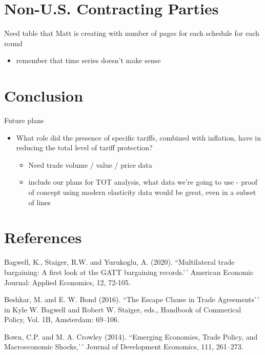 \documentclass[
  12pt,
]{article}
\providecommand{\tightlist}{%
  \setlength{\itemsep}{0pt}\setlength{\parskip}{0pt}}
\begin{document}
\hypertarget{non-u.s.-contracting-parties}{%
\section{Non-U.S. Contracting Parties}\label{non-u.s.-contracting-parties}}

Need table that Matt is creating with number of pages for each schedule for each round

\begin{itemize}
\tightlist
\item
  remember that time series doesn't make sense
\end{itemize}

\hypertarget{conclusion}{%
\section{Conclusion}\label{conclusion}}

Future plans

\begin{itemize}
\item
  What role did the presence of specific tariffs, combined with inflation, have in reducing the total level of tariff protection?

  \begin{itemize}
  \item
    Need trade volume / value / price data
  \item
    include our plans for TOT analysis, what data we're going to use - proof of concept using modern elasticity data would be great, even in a subset of lines
  \end{itemize}
\end{itemize}

\hypertarget{references}{%
\section{References}\label{references}}

Bagwell, K., Staiger, R.W. and Yurukoglu, A. (2020). ``Multilateral trade bargaining: A first look at the GATT bargaining records.'\,' American Economic Journal: Applied Economics, 12, 72-105.

Beshkar, M. and E. W. Bond (2016). ``The Escape Clause in Trade Agreements'\,' in Kyle W. Bagwell and Robert W. Staiger, eds., Handbook of Commerical Policy, Vol. 1B, Amsterdam: 69--106.

Bown, C.P. and M. A. Crowley (2014). ``Emerging Economies, Trade Policy, and Macroeconomic Shocks,'\,' Journal of Development Economics, 111, 261--273.
\end{document}
